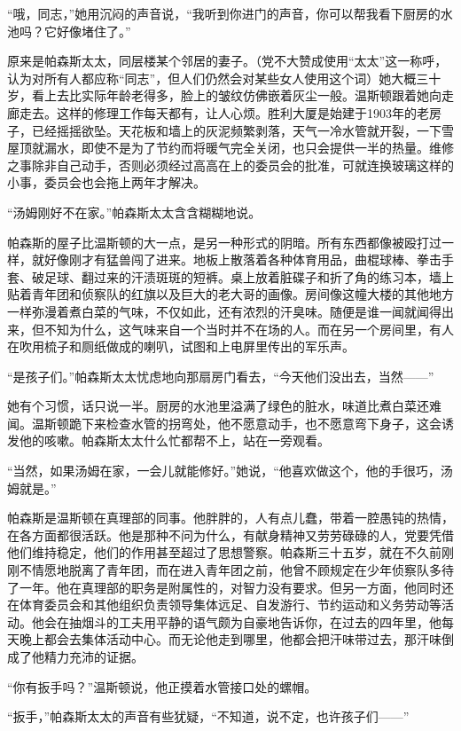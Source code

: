 ``哦，同志，''她用沉闷的声音说，``我听到你进门的声音，你可以帮我看下厨房的水池吗？它好像堵住了。''

原来是帕森斯太太，同层楼某个邻居的妻子。（党不大赞成使用``太太''这一称呼，认为对所有人都应称``同志''，但人们仍然会对某些女人使用这个词）她大概三十岁，看上去比实际年龄老得多，脸上的皱纹仿佛嵌着灰尘一般。温斯顿跟着她向走廊走去。这样的修理工作每天都有，让人心烦。胜利大厦是始建于1903年的老房子，已经摇摇欲坠。天花板和墙上的灰泥频繁剥落，天气一冷水管就开裂，一下雪屋顶就漏水，即使不是为了节约而将暖气完全关闭，也只会提供一半的热量。维修之事除非自己动手，否则必须经过高高在上的委员会的批准，可就连换玻璃这样的小事，委员会也会拖上两年才解决。

``汤姆刚好不在家。''帕森斯太太含含糊糊地说。

帕森斯的屋子比温斯顿的大一点，是另一种形式的阴暗。所有东西都像被殴打过一样，就好像刚才有猛兽闯了进来。地板上散落着各种体育用品，曲棍球棒、拳击手套、破足球、翻过来的汗渍斑斑的短裤。桌上放着脏碟子和折了角的练习本，墙上贴着青年团和侦察队的红旗以及巨大的老大哥的画像。房间像这幢大楼的其他地方一样弥漫着煮白菜的气味，不仅如此，还有浓烈的汗臭味。随便是谁一闻就闻得出来，但不知为什么，这气味来自一个当时并不在场的人。而在另一个房间里，有人在吹用梳子和厕纸做成的喇叭，试图和上电屏里传出的军乐声。

``是孩子们。''帕森斯太太忧虑地向那扇房门看去，``今天他们没出去，当然------''

她有个习惯，话只说一半。厨房的水池里溢满了绿色的脏水，味道比煮白菜还难闻。温斯顿跪下来检查水管的拐弯处，他不愿意动手，也不愿意弯下身子，这会诱发他的咳嗽。帕森斯太太什么忙都帮不上，站在一旁观看。

``当然，如果汤姆在家，一会儿就能修好。''她说，``他喜欢做这个，他的手很巧，汤姆就是。''

帕森斯是温斯顿在真理部的同事。他胖胖的，人有点儿蠢，带着一腔愚钝的热情，在各方面都很活跃。他是那种不问为什么，有献身精神又劳劳碌碌的人，党要凭借他们维持稳定，他们的作用甚至超过了思想警察。帕森斯三十五岁，就在不久前刚刚不情愿地脱离了青年团，而在进入青年团之前，他曾不顾规定在少年侦察队多待了一年。他在真理部的职务是附属性的，对智力没有要求。但另一方面，他同时还在体育委员会和其他组织负责领导集体远足、自发游行、节约运动和义务劳动等活动。他会在抽烟斗的工夫用平静的语气颇为自豪地告诉你，在过去的四年里，他每天晚上都会去集体活动中心。而无论他走到哪里，他都会把汗味带过去，那汗味倒成了他精力充沛的证据。

``你有扳手吗？''温斯顿说，他正摸着水管接口处的螺帽。

``扳手，''帕森斯太太的声音有些犹疑，``不知道，说不定，也许孩子们------''

